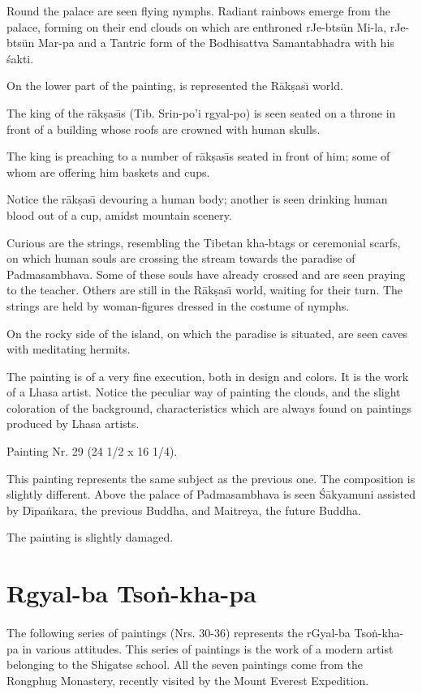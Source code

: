 \documentclass[a4paper, 12pt, oneside]{article}
\begin{document}
Round the palace are seen flying nymphs. Radiant rainbows emerge from the palace, forming on their end clouds on which are enthroned rJe-btsün Mi-la, rJe-btsün Mar-pa and a Tantric form of the Bodhisattva Samantabhadra with his \'{s}akti.

On the lower part of the painting, is represented the R\={a}k\d{s}as\={\i} world.

The king of the r\={a}k\d{s}as\={\i}s (Tib. Srin-po'i rgyal-po) is seen seated on a throne in front of a building whose roofs are crowned with human skulls.

The king is preaching to a number of r\={a}k\d{s}as\={\i}s seated in front of him; some of whom are offering him baskets and cups.

Notice the r\={a}k\d{s}as\={\i} devouring a human body; another is seen drinking human blood out of a cup, amidst mountain scenery.

Curious are the strings, resembling the Tibetan kha-btags or ceremonial scarfs, on which human souls are crossing the stream towards the paradise of Padmasambhava. Some of these souls have already crossed and are seen praying to the teacher. Others are still in the R\={a}k\d{s}as\={\i} world, waiting for their turn. The strings are held by woman-figures dressed in the costume of nymphs.

On the rocky side of the island, on which the paradise is situated, are seen caves with meditating hermits.

The painting is of a very fine execution, both in design and colors. It is the work of a Lhasa artist. Notice the peculiar way of painting the clouds, and the slight coloration of the background, characteristics which are always found on paintings produced by Lhasa artists.

\bigskip

Painting Nr. 29 (24 1/2 x 16 1/4).

\bigskip

This painting represents the same subject as the previous one. The composition is slightly different. Above the palace of Padmasambhava is seen \'{S}\={a}kyamuni assisted by D\={\i}pa\.{n}kara, the previous Buddha, and Maitreya, the future Buddha.

The painting is slightly damaged. 

\clearpage
\section{Rgyal-ba Tso\.{n}-kha-pa}
\paragraph{}
The following series of paintings (Nrs. 30-36) represents the rGyal-ba Tso\.{n}-kha-pa in various attitudes. This series of paintings is the work of a modern artist belonging to the Shigatse school. All the seven paintings come from the Rongphug Monastery, recently visited by the Mount Everest Expedition.
\end{document}
